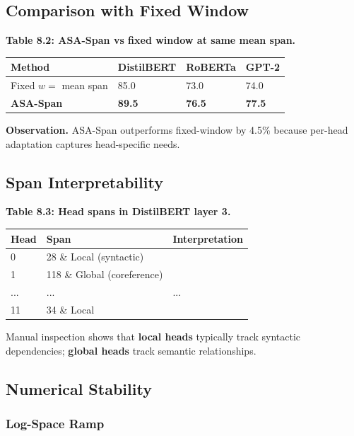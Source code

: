 \subsection{Comparison with Fixed Window}

\textbf{Table 8.2: ASA-Span vs fixed window at same mean span.}

\begin{table}[H]
\centering
\small
\begin{tabular}{llll}
\toprule
\textbf{Method} & \textbf{DistilBERT} & \textbf{RoBERTa} & \textbf{GPT-2} \\
\midrule
Fixed $w = $ mean span & 85.0 & 73.0 & 74.0 \\
\textbf{ASA-Span} & \textbf{89.5} & \textbf{76.5} & \textbf{77.5} \\
\bottomrule
\end{tabular}
\end{table}

\textbf{Observation.} ASA-Span outperforms fixed-window by 4.5\% 
because per-head adaptation captures head-specific needs.

\subsection{Span Interpretability}

\textbf{Table 8.3: Head spans in DistilBERT layer 3.}

\begin{table}[H]
\centering
\small
\begin{tabular}{lll}
\toprule
\textbf{Head} & \textbf{Span} & \textbf{Interpretation} \\
\midrule
0 & 28 \& Local (syntactic) \\
1 & 118 \& Global (coreference) \\
... & ... & ... \\
11 & 34 \& Local \\
\bottomrule
\end{tabular}
\end{table}

Manual inspection shows that \textbf{local heads} typically track syntactic 
dependencies; \textbf{global heads} track semantic relationships.

\subsection{Numerical Stability}

\subsubsection{Log-Space Ramp}

